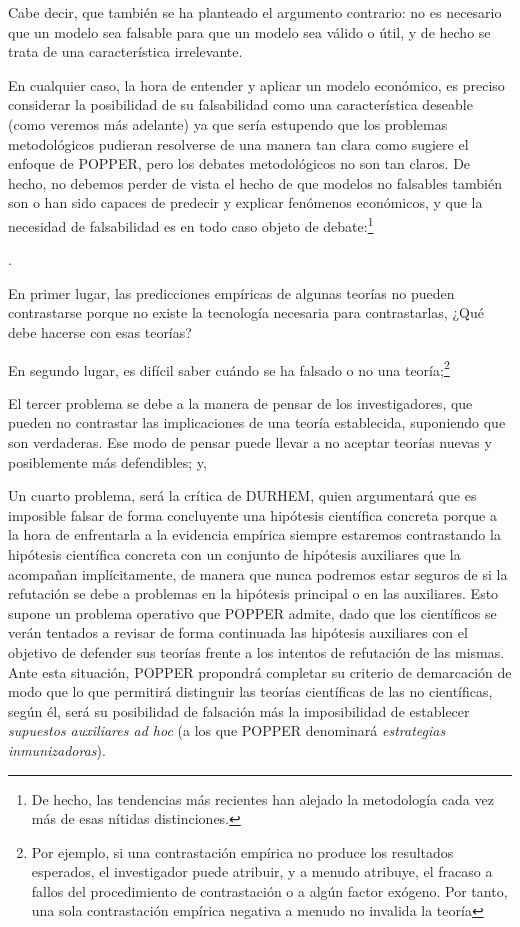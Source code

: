 \documentclass[10pt,a4paper]{article}
\newcounter{numitem}
\newenvironment{lnum}
      {\begin{list}{\arabic{numitem}.}{%
          \usecounter{numitem}%
          \setlength{\leftmargin}{1cm}%
          \setlength{\parskip}{3pt}%
          \setlength{\itemsep}{0pt}%
          \setlength{\parsep}{0pt}%
      }}
      {\end{list}}
\begin{document}
Cabe decir, que también se ha planteado el argumento contrario: no es necesario que un modelo sea falsable para que un modelo sea válido o útil, y de hecho se trata de una característica irrelevante. 

En cualquier caso, la hora de entender y aplicar un modelo económico, es preciso considerar la posibilidad de su falsabilidad como una característica deseable (como veremos más adelante) ya que sería estupendo que los problemas metodológicos pudieran resolverse de una manera tan clara como sugiere el enfoque de POPPER, pero los debates metodológicos no son tan claros.
De hecho, no debemos perder de vista el hecho de que modelos no falsables también son o han sido capaces de predecir y explicar fenómenos económicos, y que la necesidad de falsabilidad es en todo caso objeto de debate:\footnote{%
    De hecho, las tendencias más recientes han alejado la metodología cada vez más de esas nítidas distinciones.
}
\begin{lnum}
  \item En primer lugar, las predicciones empíricas de algunas teorías no pueden contrastarse porque no existe la tecnología necesaria para contrastarlas, ¿Qué debe hacerse con esas teorías?
  \item En segundo lugar, es difícil saber cuándo se ha falsado o no una teoría;\footnote{%
      Por ejemplo, si una contrastación empírica no produce los resultados esperados, el investigador puede atribuir, y a menudo atribuye, el fracaso a fallos del procedimiento de contrastación o a algún factor exógeno. Por tanto, una sola contrastación empírica negativa a menudo no invalida la teoría
  }
  \item El tercer problema se debe a la manera de pensar de los investigadores, que pueden no contrastar las implicaciones de una teoría establecida, suponiendo que son verdaderas. Ese modo de pensar puede llevar a no aceptar teorías nuevas y posiblemente más defendibles; y,
  \item Un cuarto problema, será la crítica de DURHEM, quien argumentará que es imposible falsar de forma concluyente una hipótesis científica concreta porque a la hora de enfrentarla a la evidencia empírica siempre estaremos contrastando la hipótesis científica concreta con un conjunto de hipótesis auxiliares que la acompañan implícitamente, de manera que nunca podremos estar seguros de si la refutación se debe a problemas en la hipótesis principal o en las auxiliares. Esto supone un problema operativo que POPPER admite, dado que los científicos se verán tentados a revisar de forma continuada las hipótesis auxiliares con el objetivo de defender sus teorías frente a los intentos de refutación de las mismas. Ante esta situación, POPPER propondrá completar su criterio de demarcación de modo que lo que permitirá distinguir las teorías científicas de las no científicas, según él, será su posibilidad de falsación más la imposibilidad de establecer \textit{supuestos auxiliares ad hoc} (a los que POPPER denominará \textit{estrategias inmunizadoras}).
\end{lnum}
\end{document}
